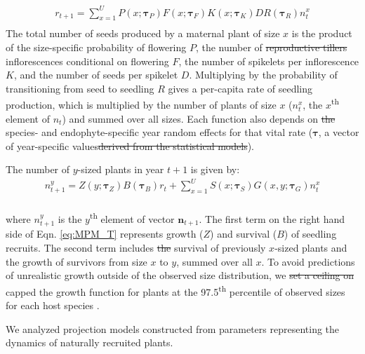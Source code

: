 \documentclass[lineno,sn-nature]{sn-jnl}%
\providecommand{\DIFadd}[1]{{\protect\color{blue}#1}} %
\providecommand{\DIFdel}[1]{{\protect\color{red}\protect\scriptsize\sout{#1}}}
\providecommand{\DIFadd}[1]{{\protect\color{blue}\uwave{#1}}} %
\providecommand{\DIFdel}[1]{{\protect\color{red}\sout{#1}}}                      %
\providecommand{\DIFaddbegin}{} %
\providecommand{\DIFaddend}{} %
\providecommand{\DIFdelbegin}{} %
\providecommand{\DIFdelend}{} %
\newcommand{\DIFscaledelfig}{0.5}
\newlength{\DIFdelgraphicswidth} %
\newlength{\DIFdelgraphicsheight} %
\newcommand{\DIFaddincludegraphics}[2][]{{\color{blue}\fbox{\DIFOincludegraphics[#1]{#2}}}} %
\newcommand{\DIFdelincludegraphics}[2][]{%
\sbox{\DIFdelgraphicsbox}{\DIFOincludegraphics[#1]{#2}}%
\settoboxwidth{\DIFdelgraphicswidth}{\DIFdelgraphicsbox} %
\settoboxtotalheight{\DIFdelgraphicsheight}{\DIFdelgraphicsbox} %
\scalebox{\DIFscaledelfig}{%
\parbox[b]{\DIFdelgraphicswidth}{\usebox{\DIFdelgraphicsbox}\\[-\baselineskip] \rule{\DIFdelgraphicswidth}{0em}}\llap{\resizebox{\DIFdelgraphicswidth}{\DIFdelgraphicsheight}{%
\setlength{\unitlength}{\DIFdelgraphicswidth}%
\begin{picture}(1,1)%
\thicklines\linethickness{2pt} %
{\color[rgb]{1,0,0}\put(0,0){\framebox(1,1){}}}%
{\color[rgb]{1,0,0}\put(0,0){\line( 1,1){1}}}%
{\color[rgb]{1,0,0}\put(0,1){\line(1,-1){1}}}%
\end{picture}%
}\hspace*{3pt}}} %
} %
\DeclareRobustCommand{\DIFaddbegin}{\DIFOaddbegin \let\includegraphics\DIFaddincludegraphics} %
\DeclareRobustCommand{\DIFaddend}{\DIFOaddend \let\includegraphics\DIFOincludegraphics} %
\DeclareRobustCommand{\DIFdelbegin}{\DIFOdelbegin \let\includegraphics\DIFdelincludegraphics} %
\DeclareRobustCommand{\DIFdelend}{\DIFOaddend \let\includegraphics\DIFOincludegraphics} %
\begin{document}
	\begin{equation} 
		\label{eq:MPM_F}
		\begin{aligned}
			r_{t+1} = \sum_{x=1}^{U} P(x; \pmb{\tau}_{P})F(x; \pmb{\tau}_{F})K(x; \pmb{\tau}_{K})DR(\pmb{\tau}_{R}) n^x_{t}\\
		\end{aligned}
	\end{equation}
	The total number of seeds produced by a maternal plant of size $x$ is the product of the size-specific probability of flowering $P$, the number of \DIFdelbegin \DIFdel{reproductive tillers }\DIFdelend \DIFaddbegin \DIFadd{inflorescences conditional on flowering }\DIFaddend $F$, the number of spikelets per inflorescence $K$, and the number of seeds per spikelet $D$. 
	Multiplying by the probability of transitioning from seed to seedling $R$ gives a per-capita rate of seedling production, which is multiplied by the number of plants of size $x$ ($n^x_{t}$, the $x$\textsuperscript{th} element of \textbf{$n_{t}$}) and summed over all sizes. 
	Each function also depends on \DIFdelbegin \DIFdel{the }\DIFdelend species- and endophyte-specific year random effects for that vital rate ($\pmb{\tau}$, a vector of year-specific values\DIFdelbegin \DIFdel{derived from the statistical models}\DIFdelend ). 

	The number of $y$-sized plants in year $t+1$ is given by:
	\begin{equation} 
		\label{eq:MPM_T}
		\begin{aligned}
			n^y_{t+1} = Z(y; \pmb{\tau}_{Z})B(\pmb{\tau}_{B})r_{t}  + 
			\sum_{x=1}^{U} S(x; \pmb{\tau}_{S})G(x,y; \pmb{\tau}_{G}) n^x_{t}\\
		\end{aligned}
	\end{equation}
	
\DIFaddbegin 

	\DIFaddend where $n^y_{t+1}$ is the $y$\textsuperscript{th} element of vector {$\textbf{n}_{t+1}$}.
	The first term on the right hand side of Eqn. \ref{eq:MPM_T} represents growth ($Z$) and survival ($B$) of seedling recruits. 
	The second term includes \DIFdelbegin \DIFdel{the }\DIFdelend survival of previously $x$-sized plants and the growth of survivors from size $x$ to $y$, summed over all $x$. 
	To avoid predictions of unrealistic growth outside of the observed size distribution, we \DIFdelbegin \DIFdel{set a ceiling on }\DIFdelend \DIFaddbegin \DIFadd{capped }\DIFaddend the growth function for plants at the 97.5\textsuperscript{th} percentile of observed sizes for each host species \cite{williams2012avoiding}. 
	\DIFaddbegin \DIFadd{We analyzed projection models constructed from parameters representing the dynamics of naturally recruited plants.	
	
}\DIFaddend 
\end{document}
